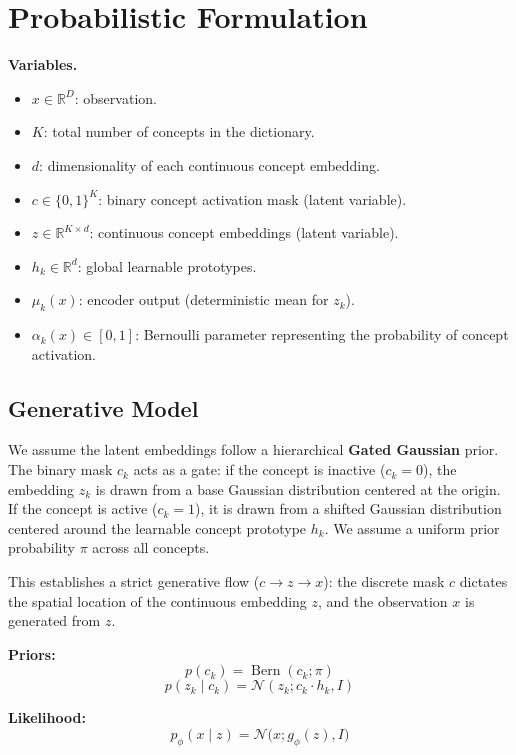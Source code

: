 \documentclass[11pt, a4paper]{article}
\title{}
\author{}
\date{}
\begin{document}
\section{Probabilistic Formulation}

\noindent \textbf{Variables.}
\begin{itemize}
    \item $x \in \mathbb{R}^D$: observation.
    \item $K$: total number of concepts in the dictionary.
    \item $d$: dimensionality of each continuous concept embedding.
    \item $c \in \{0,1\}^K$: binary concept activation mask (latent variable).
    \item $z \in \mathbb{R}^{K \times d}$: continuous concept embeddings (latent variable).
    \item $h_k \in \mathbb{R}^d$: global learnable prototypes.
    \item $\mu_k(x)$: encoder output (deterministic mean for $z_k$).
    \item $\alpha_k(x) \in [0,1]$: Bernoulli parameter representing the probability of concept activation.
\end{itemize}

\subsection{Generative Model}

We assume the latent embeddings follow a hierarchical \textbf{Gated Gaussian} prior. The binary mask $c_k$ acts as a gate: if the concept is inactive ($c_k=0$), the embedding $z_k$ is drawn from a base Gaussian distribution centered at the origin. If the concept is active ($c_k=1$), it is drawn from a shifted Gaussian distribution centered around the learnable concept prototype $h_k$. We assume a uniform prior probability $\pi$ across all concepts.

This establishes a strict generative flow ($c \to z \to x$): the discrete mask $c$ dictates the spatial location of the continuous embedding $z$, and the observation $x$ is generated from $z$.

\textbf{Priors:}
\[
p(c_k) = \operatorname{Bern}(c_k; \pi)
\]
\[
p(z_k \mid c_k) = \mathcal{N}(z_k; c_k \cdot h_k, I)
\]

\textbf{Likelihood:}
\[
p_\phi(x \mid z) = \mathcal{N}\!\bigl(x; g_\phi(z), I\bigr)
\]
\end{document}
